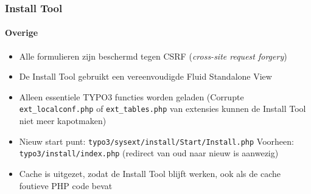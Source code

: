 
\begin{frame}[fragile]
	\frametitle{Install Tool}
	\framesubtitle{Overige}

	\begin{itemize}
		\item Alle formulieren zijn beschermd tegen CSRF (\textit{cross-site request forgery}) 		\item De Install Tool gebruikt een vereenvoudigde Fluid Standalone View
		\item Alleen essentiele TYPO3 functies worden geladen\newline
			(Corrupte \texttt{ext\_localconf.php} of \texttt{ext\_tables.php} van extensies kunnen de Install Tool niet meer kapotmaken)
		\item Nieuw start punt:	\tabto{3.2cm} \texttt{typo3/sysext/install/Start/Install.php}\newline
			Voorheen:					\tabto{3.2cm} \texttt{typo3/install/index.php}\newline
									\tabto{3.2cm} (redirect van oud naar nieuw is aanwezig)
		\item Cache is uitgezet, zodat de Install Tool blijft werken, ook als de cache foutieve PHP code bevat
	\end{itemize}

\end{frame}


